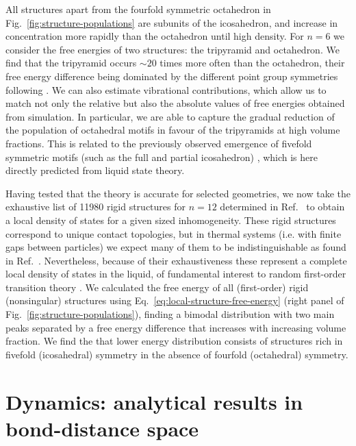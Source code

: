 \documentclass[11pt,twoside]{report}
\begin{document}
All structures apart from the fourfold symmetric octahedron in Fig.\ \ref{fig:structure-populations} are subunits of the icosahedron, and increase in concentration more rapidly than the octahedron until high density.
For $n=6$ we consider the free energies of two structures: the tripyramid and octahedron.
We find that the tripyramid occurs $\sim20$ times more often than the octahedron, their free energy difference being dominated by the different point group symmetries following \cite{MalinsJPCM2009,MengS2010}.
We can also estimate vibrational contributions, which allow us to match not only the relative but also the absolute values of free energies obtained from simulation.
In particular, we are able to capture the gradual reduction of the population of octahedral motifs in favour of the tripyramids at high volume fractions.
This is related to the previously observed emergence of fivefold symmetric motifs (such as the full and partial icosahedron) \cite{RoyallPR2015,TarjusJPCM2005,HallettNC2018,DunleavyNC2015}, which is here directly predicted from liquid state theory.

Having tested that the theory is accurate for selected geometries, we now take the exhaustive list of 11980 rigid structures for $n=12$ determined in Ref.\ \cite{Holmes-CerfonSR2016} to obtain a local density of states for a given sized inhomogeneity.
These rigid structures correspond to unique contact topologies, but in thermal systems (i.e. with finite gaps between particles) we expect many of them to be indistinguishable as found in Ref.\ \cite{TrombachPRE2018}.
Nevertheless, because of their exhaustiveness these represent a complete local density of states in the liquid, of fundamental interest to random first-order transition theory \cite{LubchenkoARPC2007}.
We calculated the free energy of all (first-order) rigid (nonsingular) structures using Eq.\ \eqref{eq:local-structure-free-energy} (right panel of Fig.\ \ref{fig:structure-populations}), finding a bimodal distribution with two main peaks separated by a free energy difference that increases with increasing volume fraction.
We find the that lower energy distribution consists of structures rich in fivefold (icosahedral) symmetry in the absence of fourfold (octahedral) symmetry.

\section{Dynamics: analytical results in bond-distance space}
\end{document}
